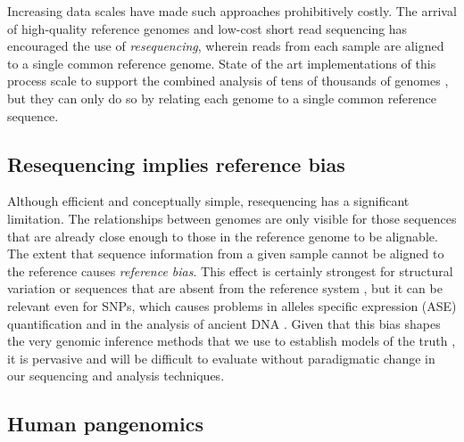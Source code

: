 Increasing data scales have made such approaches prohibitively costly.
The arrival of high-quality reference genomes and low-cost short read sequencing has encouraged the use of \emph{resequencing}, wherein reads from each sample are aligned to a single common reference genome.
State of the art implementations of this process scale to support the combined analysis of tens of thousands of genomes \cite{Poplin_2017}, but they can only do so by relating each genome to a single common reference sequence.

\subsection{Resequencing implies reference bias}

Although efficient and conceptually simple, resequencing has a significant limitation.
The relationships between genomes are only visible for those sequences that are already close enough to those in the reference genome to be alignable.
The extent that sequence information from a given sample cannot be aligned to the reference causes \emph{reference bias}.
This effect is certainly strongest for structural variation or sequences that are absent from the reference system \cite{sudmant2015integrated}, but it can be relevant even for SNPs, which causes problems in alleles specific expression (ASE) quantification \cite{stevenson2013sources} and in the analysis of ancient DNA \cite{zhou2017antcaller}.
Given that this bias shapes the very genomic inference methods that we use to establish models of the truth \cite{zook2014integrating}, it is pervasive and will be difficult to evaluate without paradigmatic change in our sequencing and analysis techniques.

\subsection{Human pangenomics}

